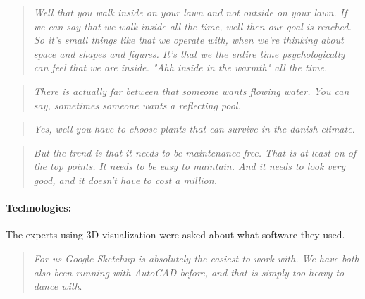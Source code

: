 \begin{quote}
	\textit{Well that you walk inside on your lawn and not outside on your lawn. If we can say that we walk inside all the time, well then our goal is reached. So it's small things like that we operate with, when we're thinking about space and shapes and figures. It's that we the entire time psychologically can feel that we are inside. "Ahh inside in the warmth" all the time.}\label{quote:expertDesign1}
\end{quote}

\begin{quote}
	\textit{There is actually far between that someone wants flowing water. You can say, sometimes someone wants a reflecting pool.}\label{quote:expertDesign2}\\
\end{quote}

\begin{quote}
	\textit{Yes, well you have to choose plants that can survive in the danish climate.}\label{quote:expertDesign3}\\
\end{quote}

\begin{quote}
	\textit{But the trend is that it needs to be maintenance-free. That is at least on of the top points. It needs to be easy to maintain. And it needs to look very good, and it doesn't have to cost a million.}\label{quote:expertDesign4}\\
\end{quote}

\paragraph*{Technologies:}
The experts using 3D visualization were asked about what software they used.
\begin{quote}
	\textit{For us Google Sketchup is absolutely the easiest to work with. We have both also been running with AutoCAD before, and that is simply too heavy to dance with}\label{quote:expertTech1}.\\
\end{quote}


